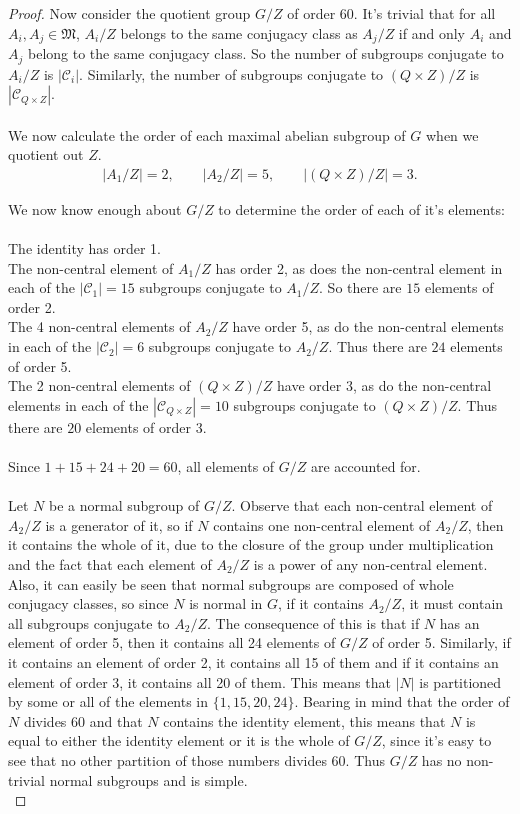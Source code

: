 \begin{proof}
Now consider the quotient group $G / Z$ of order 60. It's trivial that for all $A_i, A_j \in \mathfrak{M}$, $A_i / Z$ belongs to the same conjugacy class as $A_j / Z$ if and only $A_i$ and $A_j$ belong to the same conjugacy class. So the number of subgroups conjugate to $A_i / Z$ is $|\mathcal{C}_i|$. Similarly, the number of subgroups conjugate to $(Q\times Z) / Z$ is $|\mathcal{C}_{Q \times Z}|$. \\
\\
We now calculate the order of each maximal abelian subgroup of $G$ when we quotient out $Z$.
\begin{align*} |A_1 / Z| = 2, \qquad |A_2 / Z| = 5, \qquad |(Q \times Z) / Z| = 3.
\end{align*}

We now know enough about $G / Z$ to determine the order of each of it's elements: \\
\\
 \space The identity has order 1. \\
 \space The non-central element of $A_1 / Z$ has order 2, as does the non-central element in each of the $|\mathcal{C}_1| = 15$ subgroups conjugate to $A_1 / Z$. So there are $15$ elements of order 2. \\
 \space The 4 non-central elements of $A_2 / Z$ have order 5, as do the non-central elements in each of the $|\mathcal{C}_2| = 6$ subgroups conjugate to $A_2 / Z$. Thus there are $24$ elements of order 5. \\
 \space  The 2 non-central elements of $(Q \times Z) / Z$ have order 3, as do the non-central elements in each of the $|\mathcal{C}_{Q \times Z}| = 10$ subgroups conjugate to $(Q \times Z) / Z$. Thus there are $20$ elements of order 3. \\
\\
Since $1+15+24+20=60$, all elements of $G / Z$ are accounted for. \\
\\
Let $N$ be a normal subgroup of $G / Z$. Observe that each non-central element of $A_2 / Z$ is a generator of it, so if $N$ contains one non-central element of $A_2 / Z$, then it contains the whole of it, due to the closure of the group under multiplication and the fact that each element of $A_2 / Z$ is a power of any non-central element. Also, it can easily be seen that normal subgroups are composed of whole conjugacy classes, so since $N$ is normal in $G$, if it contains $A_2 / Z$, it must contain all subgroups conjugate to $A_2 / Z$. The consequence of this is that if $N$ has an element of order 5, then it contains all 24 elements of $G / Z$ of order 5. Similarly, if it contains an element of order 2, it contains all 15 of them and if it contains an element of order 3, it contains all 20 of them. This means that $|N|$ is partitioned by some or all of the elements in $\{ 1, 15, 20, 24 \}$. Bearing in mind that the order of $N$ divides 60 and that $N$ contains the identity element, this means that $N$ is equal to either the identity element or it is the whole of $G / Z$, since it's easy to see that no other partition of those numbers divides 60. Thus $G / Z$ has no non-trivial normal subgroups and is simple. \\

\end{proof}
